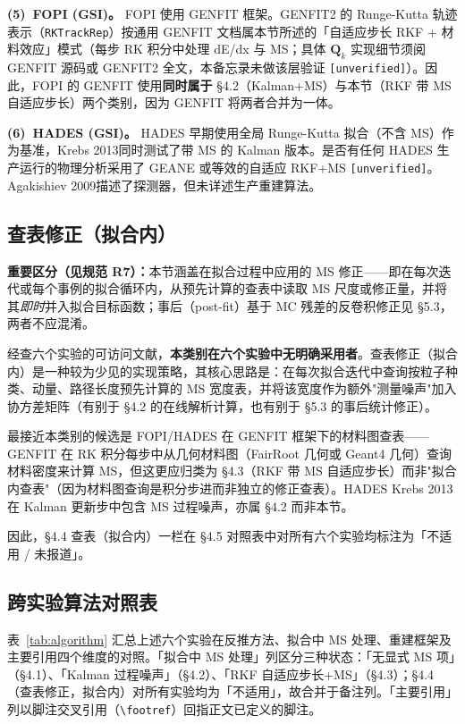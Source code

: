 \documentclass[a4paper, 11pt]{article}
\begin{document}
\textbf{(5)~FOPI (GSI)。}
FOPI 使用 GENFIT 框架。GENFIT2 的 Runge-Kutta 轨迹表示（\texttt{RKTrackRep}）按通用 GENFIT 文档属本节所述的「自适应步长 RKF + 材料效应」模式（每步 RK 积分中处理 dE/dx 与 MS；具体 $\mathbf{Q}_k$ 实现细节须阅 GENFIT 源码或 GENFIT2 全文，本备忘录未做该层验证 \texttt{[unverified]}）。因此，FOPI 的 GENFIT 使用\textbf{同时属于} §4.2（Kalman+MS）与本节（RKF 带 MS 自适应步长）两个类别，因为 GENFIT 将两者合并为一体。

\textbf{(6)~HADES (GSI)。}
HADES 早期使用全局 Runge-Kutta 拟合（不含 MS）作为基准，Krebs 2013同时测试了带 MS 的 Kalman 版本。是否有任何 HADES 生产运行的物理分析采用了 GEANE 或等效的自适应 RKF+MS \texttt{[unverified]}。Agakishiev 2009描述了探测器，但未详述生产重建算法。

\subsection{查表修正（拟合内）}
\label{sec:algo_lookup}

\textbf{重要区分（见规范 R7）：}本节涵盖在拟合过程中应用的 MS 修正——即在每次迭代或每个事例的拟合循环内，从预先计算的查表中读取 MS 尺度或修正量，并将其\emph{即时}并入拟合目标函数；事后（post-fit）基于 MC 残差的反卷积修正见 §5.3，两者不应混淆。

经查六个实验的可访问文献，\textbf{本类别在六个实验中无明确采用者}。查表修正（拟合内）是一种较为少见的实现策略，其核心思路是：在每次拟合迭代中查询按粒子种类、动量、路径长度预先计算的 MS 宽度表，并将该宽度作为额外"测量噪声"加入协方差矩阵（有别于 §4.2 的在线解析计算，也有别于 §5.3 的事后统计修正）。

最接近本类别的候选是 FOPI/HADES 在 GENFIT 框架下的材料图查表——GENFIT 在 RK 积分每步中从几何材料图（FairRoot 几何或 Geant4 几何）查询材料密度来计算 MS，但这更应归类为 §4.3（RKF 带 MS 自适应步长）而非"拟合内查表"（因为材料图查询是积分步进而非独立的修正查表）。HADES Krebs 2013在 Kalman 更新步中包含 MS 过程噪声，亦属 §4.2 而非本节。

因此，§4.4 查表（拟合内）一栏在 §4.5 对照表中对所有六个实验均标注为「不适用 / 未报道」。

\subsection{跨实验算法对照表}
\label{sec:algorithmtable}

表~\ref{tab:algorithm} 汇总上述六个实验在反推方法、拟合中 MS 处理、重建框架及主要引用四个维度的对照。「拟合中 MS 处理」列区分三种状态：「无显式 MS 项」（§4.1）、「Kalman 过程噪声」（§4.2）、「RKF 自适应步长+MS」（§4.3）；§4.4（查表修正，拟合内）对所有实验均为「不适用」，故合并于备注列。「主要引用」列以脚注交叉引用（\texttt{\textbackslash footref}）回指正文已定义的脚注。
\end{document}
